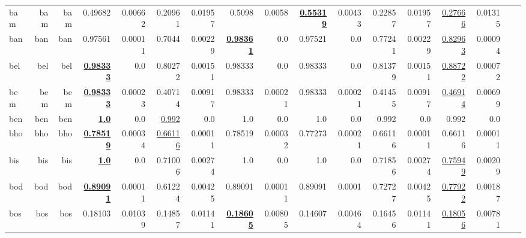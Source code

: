 \documentclass[11pt]{article}
\begin{document}
\begin{table*}[h]
{\begin{tabular}{lrrrrrrrrrrrrrrrr}
bam         & bam         & bam         & 0.49682         & 0.00662         & 0.20961         & 0.01957         & 0.5098         & 0.0058         & \textbf{\underline{0.55319}}         & 0.00433         & 0.22857         & 0.01957         & \underline{0.27666}         & 0.01315         \\
ban         & ban         & ban         & 0.97561         & 0.00011         & 0.7044         & 0.00229         & \textbf{\underline{0.98361}}         & 0.0         & 0.97521         & 0.0         & 0.77241         & 0.00229         & \underline{0.82963}         & 0.00094         \\
bel         & bel         & bel         & \textbf{\underline{0.98333}}         & 0.0         & 0.80272         & 0.00151         & 0.98333         & 0.0         & 0.98333         & 0.0         & 0.81379         & 0.00151         & \underline{0.88722}         & 0.00072         \\
bem         & bem         & bem         & \textbf{\underline{0.98333}}         & 0.00023         & 0.40714         & 0.00917         & 0.98333         & 0.00021         & 0.98333         & 0.00021         & 0.41455         & 0.00917         & \underline{0.46914}         & 0.00699         \\
ben         & ben         & ben         & \textbf{\underline{1.0}}         & 0.0         & \underline{0.992}         & 0.0         & 1.0         & 0.0         & 1.0         & 0.0         & 0.992         & 0.0         & 0.992         & 0.0         \\
bho         & bho         & bho         & \textbf{\underline{0.78519}}         & 0.00034         & \underline{0.66116}         & 0.00011         & 0.78519         & 0.00032         & 0.77273         & 0.00021         & 0.66116         & 0.00011         & 0.66116         & 0.00011         \\
bis         & bis         & bis         & \textbf{\underline{1.0}}         & 0.0         & 0.71006         & 0.00274         & 1.0         & 0.0         & 1.0         & 0.0         & 0.71856         & 0.00274         & \underline{0.75949}         & 0.00209         \\
bod         & bod         & bod         & \textbf{\underline{0.89091}}         & 0.00011         & 0.61224         & 0.00425         & 0.89091         & 0.00011         & 0.89091         & 0.0001         & 0.72727         & 0.00425         & \underline{0.77922}         & 0.00187         \\
bos         & bos         & bos         & 0.18103         & 0.01039         & 0.14857         & 0.01141         & \textbf{\underline{0.18605}}         & 0.00805         & 0.14607         & 0.00464         & 0.16456         & 0.01141         & \underline{0.18056}         & 0.00781         \\

\end{tabular}}
\end{table*}
\end{document}

